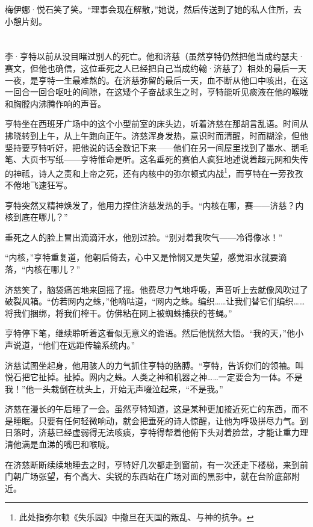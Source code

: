 \documentclass[AutoFakeBold=true]{book}
\begin{document}
梅伊娜·悦石笑了笑。``理事会现在解散，''她说，然后传送到了她的私人住所，去小憩片刻。

\chapter{}

李·亨特以前从没目睹过别人的死亡。他和济慈（虽然亨特仍然把他当成约瑟夫·赛文，但他也确信，这位垂死之人已经把自己当成约翰·济慈了）相处的最后一天一夜，是亨特一生最难熬的。在济慈弥留的最后一天，血不断从他口中咳出，在这一回合一回合呕吐的间隙，在这矮个子奋战求生之时，亨特能听见痰液在他的喉咙和胸膛内沸腾作响的声音。

亨特坐在西班牙广场中的这个小型前室的床头边，听着济慈在那胡言乱语。时间从拂晓转到上午，从上午跑向正午。济慈浑身发热，意识时而清醒，时而糊涂，但他坚持要亨特听好，把他说的话全数记下来——他们在另一间屋里找到了墨水、鹅毛笔、大页书写纸——亨特惟命是听。这名垂死的赛伯人疯狂地述说着超元网和失传的神祗，诗人之责和上帝之死，还有内核中的弥尔顿式内战\footnote{此处指弥尔顿《失乐园》中撒旦在天国的叛乱、与神的抗争。}，而亨特在一旁孜孜不倦地飞速狂写。

亨特突然又精神焕发了，他用力捏住济慈发热的手。``内核在哪，赛——济慈？内核到底在哪儿？''

垂死之人的脸上冒出滴滴汗水，他别过脸。``别对着我吹气——冷得像冰！''

``内核，''亨特重复道，他朝后倚去，心中又是怜悯又是失望，感觉泪水就要滴落，``内核在哪儿？''

济慈笑了，脑袋痛苦地来回摇了摇。他费尽力气地呼吸，声音听上去就像风吹过了破裂风箱。``仿若网内之蛛，''他嘀咕道，``网内之蛛。编织……让我们替它们编织……将我们捆绑，将我们榨干。仿佛粘在网上被蜘蛛捕获的苍蝇。''

亨特停下笔，继续聆听着这看似无意义的谵语。然后他恍然大悟。``我的天，''他小声说道，``他们在远距传输系统内。''

济慈试图坐起身，他用骇人的力气抓住亨特的胳膊。``亨特，告诉你们的领袖。叫悦石把它扯掉。扯掉。网内之蛛。人类之神和机器之神……一定要合为一体。不是我！''他一头栽倒在枕头上，开始无声啜泣起来，``不是我。''

济慈在漫长的午后睡了一会。虽然亨特知道，这是某种更加接近死亡的东西，而不是睡眠。只要有任何轻微响动，就会把垂死的诗人惊醒，让他为呼吸拼尽力气。到日落时，济慈已经虚弱得无法咳痰，亨特得帮着他俯下头对着脸盆，才能让重力理清他满是血涕的嘴巴和喉咙。

在济慈断断续续地睡去之时，亨特好几次都走到窗前，有一次还走下楼梯，来到前门朝广场张望，有个高大、尖锐的东西站在广场对面的黑影中，就在台阶底部附近。
\end{document}
